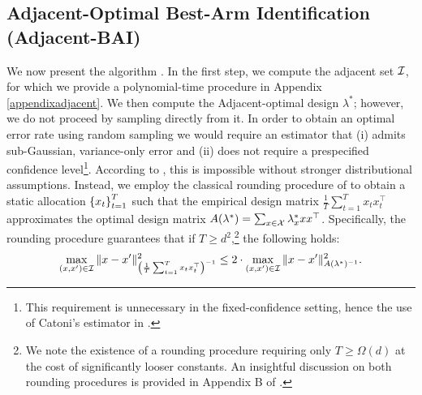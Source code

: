 \subsection{Adjacent-Optimal Best-Arm Identification (Adjacent-BAI)}
We now present the algorithm \algoname. In the first step, we compute the adjacent set $\mathcal{I}$, for which we provide a polynomial-time procedure in Appendix \ref{appendixadjacent}. We then compute the Adjacent-optimal design $\lambda^*$; however, we do not proceed by sampling directly from it. In order to obtain an optimal error rate using random sampling we would require an estimator that (i) admits sub-Gaussian, variance-only error and (ii) does not require a prespecified confidence level\footnote{This requirement is unnecessary in the fixed-confidence setting, hence the use of Catoni's estimator in \citet{pmlr-v139-camilleri21a}.}. According to \cite{devroye2016sub}, this is impossible without stronger distributional assumptions. Instead, we employ the classical rounding procedure of \citet{10.5555/1137748} to obtain a static allocation $\left\{x_t\right\}_{t=1}^{T}$ such that the empirical design matrix $\frac{1}{T}\sum_{t=1}^{T}x_tx_t^\top$ approximates the optimal design matrix $A(\lambda^*) =\sum_{x\in\mathcal{X}} \lambda^*_{x} xx^\top$. Specifically, the rounding procedure guarantees that if $T \geq d^2$,\footnote{We note the existence of a rounding procedure requiring only $T \geq \Omega(d)$ \citep{pmlr-v70-allen-zhu17e} at the cost of significantly looser constants. An insightful discussion on both rounding procedures is provided in Appendix B of \citet{NEURIPS2019_8ba6c657}.} the following holds:
\begin{equation}\label{eq:roundingerror}
    \max_{(x,x')\in \mathcal{I}}\|x - x'\|_{\left(\frac{1}{T}\sum_{t=1}^Tx_{t}x_{t}^\top\right)^{-1}}^2 \leq 2 \cdot \max_{(x,x')\in \mathcal{I}}\|x - x'\|_{A(\lambda^{*})^{-1}}^2.\end{equation}
